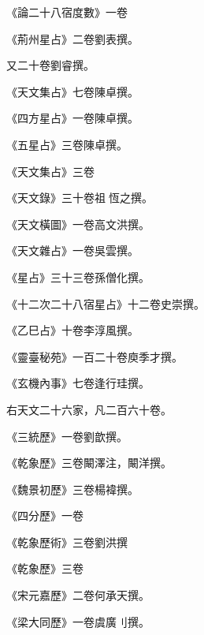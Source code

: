 \begin{pinyinscope}
 《論二十八宿度數》一卷



 《荊州星占》二卷劉表撰。



 又二十卷劉睿撰。



 《天文集占》七卷陳卓撰。



 《四方星占》一卷陳卓撰。



 《五星占》三卷陳卓撰。



 《天文集占》三卷



 《天文錄》三十卷祖恆之撰。



 《天文橫圖》一卷高文洪撰。



 《天文雜占》一卷吳雲撰。



 《星占》三十三卷孫僧化撰。



 《十二次二十八宿星占》十二卷史崇撰。



 《乙巳占》十卷李淳風撰。



 《靈臺秘苑》一百二十卷庾季才撰。



 《玄機內事》七卷逢行珪撰。



 右天文二十六家，凡二百六十卷。



 《三統歷》一卷劉歆撰。



 《乾象歷》三卷闞澤注，闞洋撰。



 《魏景初歷》三卷楊褘撰。



 《四分歷》一卷



 《乾象歷術》三卷劉洪撰



 《乾象歷》三卷



 《宋元嘉歷》二卷何承天撰。



 《梁大同歷》一卷虞廣刂撰。




\end{pinyinscope}
